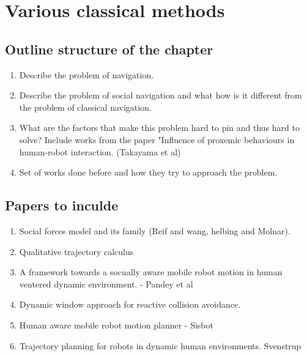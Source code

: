 \section{Various classical methods}
\hline
\subsection*{Outline structure of the chapter}
\begin{enumerate}
    \item Describe the problem of navigation.
    \item Describe the problem of social navigation and what how is it different from the problem of classical navigation.

    \item What are the factors that make this problem hard to pin and thus hard to solve? Include works from the paper "Influence of proxemic behaviours in human-robot interaction. (Takayama et al)
    \item Set of works done before and how they try to approach the problem.
\end{enumerate}

\subsection*{Papers to inculde}
    \begin{enumerate}
        \item Social forces model and its family (Reif and wang, helbing and Molnar).
        \item Qualitative trajectory calculus
        \item A framework towards a socually aware mobile robot motion in human ventered dynamic environment. - Pandey et al
        \item Dynamic window approach for reactive collision avoidance.
        \item Human aware mobile robot motion planner - Sisbot
        \item Trajectory planning for robots in dynamic human environments. Svenstrup
    \end{enumerate}

\hline

